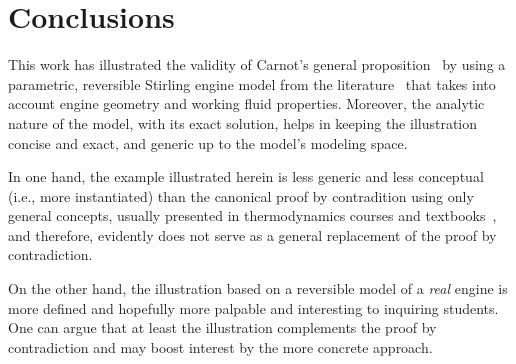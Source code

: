 \section{Conclusions}

    This     work     has     illustrated     the     validity     of      Carnot's      general
    proposition~\cite{1897-ThurstonRH-Wiley} by using a parametric, reversible  Stirling  engine
    model from the literature~\cite{2012-ChengCH+YangHS-ApEnergy} that takes into account engine
    geometry and working fluid properties. Moreover, the analytic nature of the model, with  its
    exact solution, helps in keeping the illustration concise and exact, and generic up  to  the
    model's modeling space.

    In one hand, the example illustrated herein is less generic and less conceptual (i.e.,  more
    instantiated) than the canonical proof by contradition using only general concepts,  usually
    presented  in   thermodynamics   courses   and   textbooks~\cite{2013-CengelYA+BolesMA-AMGH,
    2002-MoranMJ+ShapiroHN-LTC, 1986-JonesJB+HawkinsGA-Wiley}, and therefore, evidently does not
    serve as a general replacement of the proof by contradiction.

    On the other hand, the illustration based on a reversible model of a \emph{real}  engine  is
    more defined and hopefully more palpable and interesting  to  inquiring  students.  One  can
    argue that at least the illustration complements the proof by contradiction  and  may  boost
    interest by the more concrete approach.


